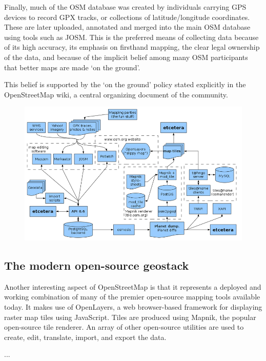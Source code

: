 \documentclass[11pt]{report}
\begin{document}
Finally, much of the OSM database was created by individuals carrying GPS devices to record GPX tracks, or collections of latitude/longitude coordinates. These are later uploaded, annotated and merged into the main OSM database using tools such as JOSM. This is the preferred means of collecting data because of its high accuracy, its emphasis on firsthand mapping, the clear legal ownership of the data, and because of the implicit belief among many OSM participants that better maps are made `on the ground'. 

This belief is supported by the `on the ground' policy stated explicitly in the OpenStreetMap wiki, a central organizing document of the community.

\begin{figure}[h]
  \begin{center}
    \includegraphics[scale=0.45]{images/osm-diagram.png}
  \end{center}
\end{figure}

\subsection{The modern open-source geostack}

Another interesting aspect of OpenStreetMap is that it represents a deployed and working combination of many of the premier open-source mapping tools available today. It makes use of OpenLayers, a web browser-based framework for displaying raster map tiles using JavaScript. Tiles are produced using Mapnik, the popular open-source tile renderer. An array of other open-source utilities are used to create, edit, translate, import, and export the data. 

...
\end{document}
